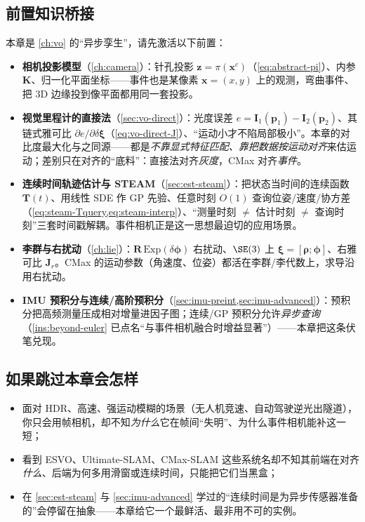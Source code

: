 \subsection*{前置知识桥接}
本章是 \cref{ch:vo} 的“异步孪生”，请先激活以下前置：
\begin{itemize}
  \item \textbf{相机投影模型}（\cref{ch:camera}）：针孔投影 $\mathbf z=\pi(\mathbf x^c)$（\cref{eq:abstract-pi}）、内参 $\mathbf K$、归一化平面坐标——事件也是某像素 $\mathbf x=(x,y)$ 上的观测，弯曲事件、把 3D 边缘投到像平面都用同一套投影。
  \item \textbf{视觉里程计的直接法}（\cref{sec:vo-direct}）：光度误差 $e=\mathbf I_1(\mathbf p_1)-\mathbf I_2(\mathbf p_2)$、其链式雅可比 $\partial e/\partial\delta\boldsymbol\xi$（\cref{eq:vo-direct-J}）、“运动小才不陷局部极小”。本章的对比度最大化与之同源——都是\emph{不靠显式特征匹配、靠把数据按运动对齐}来估运动；差别只在对齐的“底料”：直接法对齐\emph{灰度}，CMax 对齐\emph{事件}。
  \item \textbf{连续时间轨迹估计与 STEAM}（\cref{sec:est-steam}）：把状态当时间的连续函数 $\mathbf T(t)$、用线性 SDE 作 GP 先验、任意时刻 $O(1)$ 查询位姿/速度/协方差（\cref{eq:steam-Tquery,eq:steam-interp}）、“测量时刻 $\ne$ 估计时刻 $\ne$ 查询时刻”三套时间戳解耦。事件相机正是这一思想最迫切的应用场景。
  \item \textbf{李群与右扰动}（\cref{ch:lie}）：$\mathbf R\,\mathrm{Exp}(\delta\boldsymbol\phi)$ 右扰动、$\SE(3)$ 上 $\boldsymbol\xi=[\boldsymbol\rho;\boldsymbol\phi]$、右雅可比 $\mathbf J_r$。CMax 的运动参数（角速度、位姿）都活在李群/李代数上，求导沿用右扰动。
  \item \textbf{IMU 预积分与连续/高阶预积分}（\cref{sec:imu-preint,sec:imu-advanced}）：预积分把高频测量压成相对增量进因子图；连续/GP 预积分允许\emph{异步查询}（\cref{ins:beyond-euler} 已点名“与事件相机融合时增益显著”）——本章把这条伏笔兑现。
\end{itemize}

\subsection*{如果跳过本章会怎样}
\begin{itemize}
  \item 面对 HDR、高速、强运动模糊的场景（无人机竞速、自动驾驶逆光出隧道），你只会用帧相机，却不知\emph{为什么}它在帧间“失明”、为什么事件相机能补这一短；
  \item 看到 ESVO、Ultimate-SLAM、CMax-SLAM 这些系统名却不知其前端在对齐\emph{什么}、后端为何多用滑窗或连续时间，只能把它们当黑盒；
  \item 在 \cref{sec:est-steam} 与 \cref{sec:imu-advanced} 学过的“连续时间是为异步传感器准备的”会停留在抽象——本章给它一个最鲜活、最非用不可的实例。
\end{itemize}

